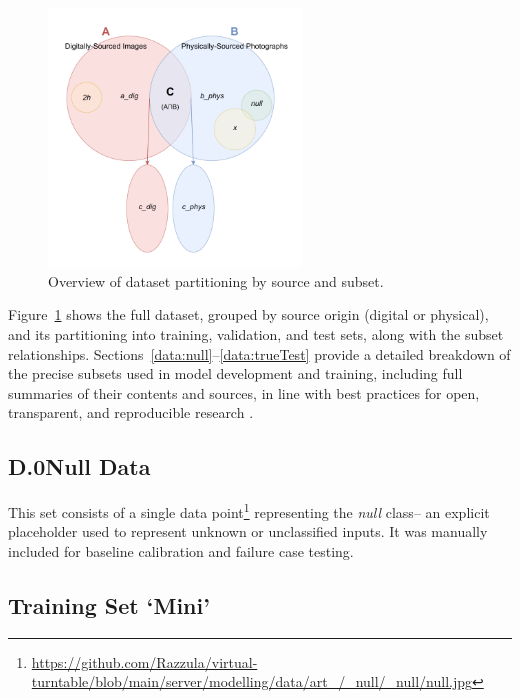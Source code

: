 \begin{uomappendix}
            \begin{figure}[H]
                \centering
                \includegraphics[width=0.6\textwidth]{images/DataVenn.pdf}
                \caption{Overview of dataset partitioning by source and subset.}
                \label{fig:dataVenn}
            \end{figure}
    
            Figure~\ref{fig:dataVenn} shows the full dataset, grouped by source origin (digital or physical), and its partitioning into training, validation, and test sets, along with the subset relationships. Sections~\ref{data:null}--\ref{data:trueTest} provide a detailed breakdown of the precise subsets used in model development and training, including full summaries of their contents and sources, in line with best practices for open, transparent, and reproducible research \cite{Mitchell_2019}.
    
            \subsection*{D.0\quad Null Data} \label{data:null}
    
                This set consists of a single data point\footnote{\url{https://github.com/Razzula/virtual-turntable/blob/main/server/modelling/data/art_/_null/_null/null.jpg}} representing the \textit{null} class-- an explicit placeholder used to represent unknown or unclassified inputs. It was manually included for baseline calibration and failure case testing.
    
            \subsection{Training Set `Mini'} \label{data:mini}
    

\end{uomappendix}
